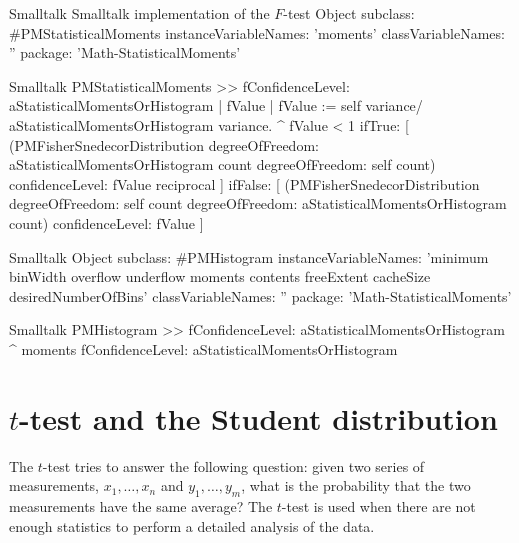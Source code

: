 \begin{listing}[label=ls:Ftest]{Smalltalk}
  {Smalltalk implementation of the $F$-test}
Object subclass: #PMStatisticalMoments
  instanceVariableNames: 'moments'
  classVariableNames: ''
  package: 'Math-StatisticalMoments'
\end{listing}

\begin{displaycode}{Smalltalk}
PMStatisticalMoments >> fConfidenceLevel: aStatisticalMomentsOrHistogram
    | fValue |
    fValue := self variance/ aStatisticalMomentsOrHistogram variance.
    ^ fValue < 1
        ifTrue: [ (PMFisherSnedecorDistribution degreeOfFreedom: 
                                  aStatisticalMomentsOrHistogram count
                        degreeOfFreedom: self count) 
                                        confidenceLevel: fValue 
                                                           reciprocal ]
        ifFalse: [ (PMFisherSnedecorDistribution degreeOfFreedom: 
                                                            self count
                        degreeOfFreedom: 
                                aStatisticalMomentsOrHistogram count) 
                                        confidenceLevel: fValue ]
\end{displaycode}

\begin{displaycode}{Smalltalk}
Object subclass: #PMHistogram
instanceVariableNames: 'minimum binWidth overflow underflow moments contents freeExtent cacheSize desiredNumberOfBins'
classVariableNames: ''
package: 'Math-StatisticalMoments'
\end{displaycode}

\begin{displaycode}{Smalltalk}
PMHistogram >> fConfidenceLevel: aStatisticalMomentsOrHistogram
    ^ moments fConfidenceLevel: aStatisticalMomentsOrHistogram
\end{displaycode}

\section{$t$-test and the Student distribution}
\label{sec:ttest} The $t$-test tries to answer the following
question: given two series of measurements, $x_1,\ldots,x_n$ and
$y_1,\ldots,y_m$, what is the probability that the two
measurements have the same average?  The $t$-test is used when
there are not enough statistics to perform a detailed analysis of
the data.

